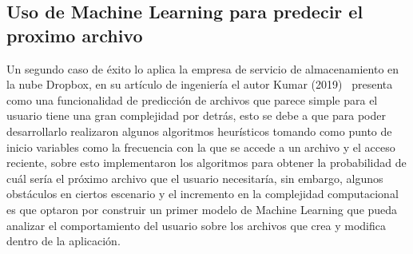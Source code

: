 \documentclass[9pt,a4paper,twoside]{rho-class/rho}
\begin{document}
        \subsection{Uso de Machine Learning para predecir el proximo archivo}
        Un segundo caso de éxito lo aplica la empresa de servicio de almacenamiento en la nube Dropbox, en su artículo de ingeniería el autor Kumar (2019)~\cite{Kumar2019} presenta como una funcionalidad de predicción de archivos que parece simple para el usuario tiene una gran complejidad por detrás, esto se debe a que para poder desarrollarlo realizaron algunos algoritmos heurísticos tomando como punto de inicio variables como la frecuencia con la que se accede a un archivo y el acceso reciente, sobre esto implementaron los algoritmos para obtener la probabilidad de cuál sería el próximo archivo que el usuario necesitaría, sin embargo, algunos obstáculos en ciertos escenario y el incremento en la complejidad computacional es que optaron por construir un primer modelo de Machine Learning que pueda analizar el comportamiento del usuario sobre los archivos que crea y modifica dentro de la aplicación.

\end{document}
